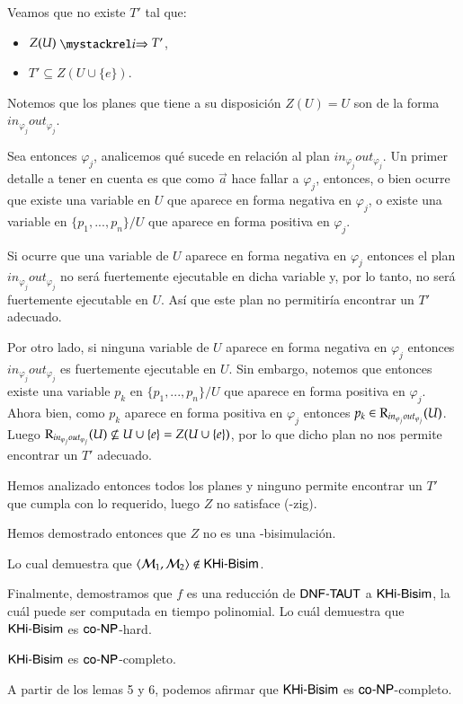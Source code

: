 \begin{demostracion}
\begin{itemize}
    Veamos que no existe $T'$ tal que:

    \begin{multicols}{2}
        \begin{itemize}
            \item $Z(U) \ultsExecAgi T'$, 
            \item $T' \subseteq Z(U \cup \{e\})$.
        \end{itemize}
    \end{multicols}

    Notemos que los planes que tiene a su disposición $Z(U) = U$ son de la forma $in_{\varphi_j}out_{\varphi_j}$.

    Sea entonces $\varphi_j$, analicemos qué sucede en relación al plan $in_{\varphi_j}out_{\varphi_j}$. Un primer detalle a tener en cuenta es que como $\overrightarrow{a}$ hace fallar a $\varphi_j$, entonces, o bien ocurre que existe una variable en $U$ que aparece en forma negativa en $\varphi_j$, o existe una variable en $\{p_1,...,p_n\}/U$ que aparece en forma positiva en $\varphi_j$.

    Si ocurre que una variable de $U$ aparece en forma negativa en $\varphi_j$ entonces el plan $in_{\varphi_j}out_{\varphi_j}$ no será fuertemente ejecutable en dicha variable y, por lo tanto, no será fuertemente ejecutable en $U$. Así que este plan no permitiría encontrar un $T'$ adecuado.

    Por otro lado, si ninguna variable de $U$ aparece en forma negativa en $\varphi_j$ entonces $in_{\varphi_j}out_{\varphi_j}$ es fuertemente ejecutable en $U$. Sin embargo, notemos que entonces existe una variable $p_k$ en $\{p_1,...,p_n\}/U$ que aparece en forma positiva en $\varphi_j$. Ahora bien, como $p_k$ aparece en forma positiva en $\varphi_j$ entonces $p_k \in \mathrm{R}_{in_{\varphi_j}out_{\varphi_j}}(U)$. Luego $\mathrm{R}_{in_{\varphi_j}out_{\varphi_j}}(U) \not \subseteq U \cup \{e\} = Z(U \cup \{e\})$, por lo que dicho plan no nos permite encontrar un $T'$ adecuado.
    
    Hemos analizado entonces todos los planes y ninguno permite encontrar un $T'$ que cumpla con lo requerido, luego $Z$ no satisface (\KHilogic-zig).

    Hemos demostrado entonces que $Z$ no es una \KHilogic-bisimulación.

    Lo cual demuestra que $\langle \mathcal{M}_1,\mathcal{M}_2 \rangle \not \in \rm\textsf{KHi-Bisim}$.
    \end{itemize}

     Finalmente, demostramos que $f$ es una reducción de $\rm\textsf{DNF-TAUT}$ a $\rm\textsf{KHi-Bisim}$, la cuál puede ser computada en tiempo polinomial. Lo cuál demuestra que $\rm\textsf{KHi-Bisim}$ es $\rm\textsf{co-NP}$-hard.

\end{demostracion}


\begin{teorema}
    $\rm\textsf{KHi-Bisim}$ es $\rm\textsf{co-NP}$-completo.
\end{teorema}


\begin{demostracion}

    A partir de los lemas 5 y 6, podemos afirmar que $\rm\textsf{KHi-Bisim}$ es $\rm\textsf{co-NP}$-completo.
    
\end{demostracion}
